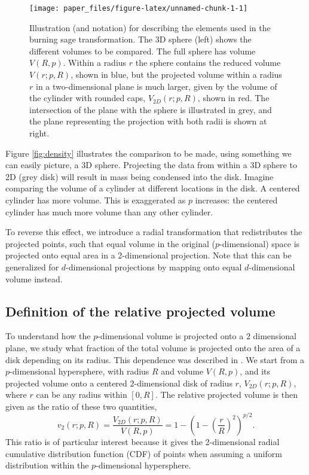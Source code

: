 \documentclass[]{interact}
\theoremstyle{plain}%
\theoremstyle{definition}
\theoremstyle{remark}
\begin{document}
\begin{figure}

{\centering \texttt{[image: paper\_files/figure-latex/unnamed-chunk-1-1]} 

}

\caption{Illustration (and notation) for describing the elements used in the burning sage transformation. The 3D sphere (left) shows the different volumes to be compared. The full sphere has volume $V(R, p)$. Within a radius $r$ the sphere contains the reduced volume $V(r; p, R)$, shown in blue, but the projected volume within a radius $r$ in a two-dimensional plane is much larger, given by the volume of the cylinder with rounded caps, $V_{2D}(r; p ,R)$, shown in red. The intersection of the plane with the sphere is illustrated in grey, and the plane representing the projection with both radii is shown at right.}\label{fig:unnamed-chunk-1}
\end{figure}

Figure \ref{fig:density} illustrates the comparison to be made, using
something we can easily picture, a 3D sphere. Projecting the data from
within a 3D sphere to 2D (grey disk) will result in mass being condensed
into the disk. Imagine comparing the volume of a cylinder at different
locations in the disk. A centered cylinder has more volume. This is
exaggerated as \(p\) increases: the centered cylinder has much more
volume than any other cylinder.

To reverse this effect, we introduce a radial transformation that
redistributes the projected points, such that equal volume in the
original (\(p\)-dimensional) space is projected onto equal area in a
2-dimensional projection. Note that this can be generalized for
\(d\)-dimensional projections by mapping onto equal \(d\)-dimensional
volume instead.

\hypertarget{definition-of-the-relative-projected-volume}{%
\subsection{Definition of the relative projected
volume}\label{definition-of-the-relative-projected-volume}}

To understand how the \(p\)-dimensional volume is projected onto a \(2\)
dimensional plane, we study what fraction of the total volume is
projected onto the area of a disk depending on its radius. This
dependence was described in \citet{Laa:2020wkm}. We start from a
\(p\)-dimensional hypersphere, with radius \(R\) and volume \(V(R, p)\),
and its projected volume onto a centered \(2\)-dimensional disk of
radius \(r\), \(V_{2D}(r; p, R)\), where \(r\) can be any radius within
\([0, R]\). The relative projected volume is then given as the ratio of
these two quantities, \begin{equation}
v_{2} (r; p, R) = \frac{V_{2D}(r; p, R)}{V(R, p)} = 1 - \left(1-\left(\frac{r}{R}\right)^2\right)^{p/2}.
\label{eq:cdf}
\end{equation} This ratio is of particular interest because it gives the
2-dimensional radial cumulative distribution function (CDF) of points
when assuming a uniform distribution within the \(p\)-dimensional
hypersphere.
\end{document}
